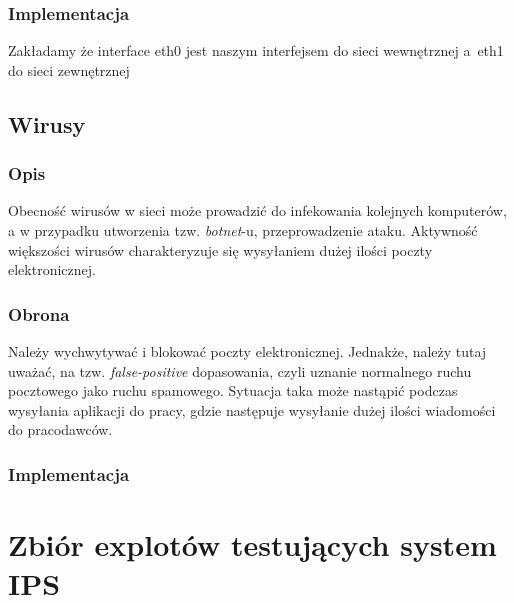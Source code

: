 \documentclass[a4paper,12pt,oneside]{book}
\begin{document}
		\subsection{Implementacja}
			\footnotesize
			Zakładamy że interface eth0 jest naszym interfejsem do sieci wewnętrznej a~eth1 do sieci zewnętrznej
			\normalsize
	\section{Wirusy}
		\subsection{Opis}
			Obecność wirusów w sieci może prowadzić do infekowania kolejnych komputerów, a w przypadku utworzenia tzw. \textit{botnet}-u, przeprowadzenie ataku.
			Aktywność większości wirusów charakteryzuje się wysyłaniem dużej ilości poczty elektronicznej.
		\subsection{Obrona}
			Należy wychwytywać i blokować poczty elektronicznej.
			Jednakże, należy tutaj uważać, na tzw. \textit{false-positive} dopasowania, czyli uznanie normalnego ruchu pocztowego jako ruchu spamowego.
			Sytuacja taka może nastąpić podczas wysyłania aplikacji do pracy, gdzie następuje wysyłanie dużej ilości wiadomości do pracodawców.
		\subsection{Implementacja}
			\footnotesize
			\normalsize
\appendix
\chapter{Zbiór explotów testujących system IPS}
\end{document}
